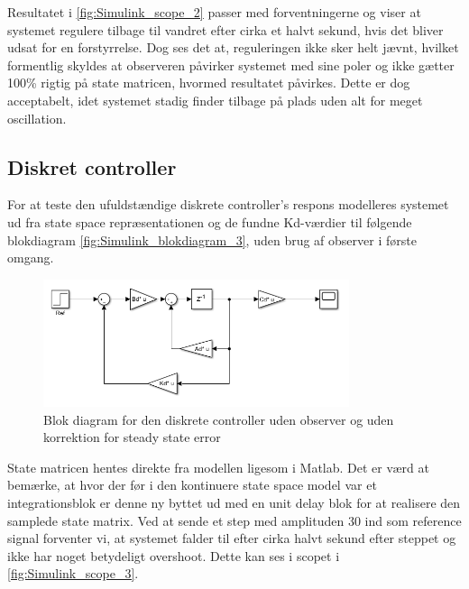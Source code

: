 Resultatet i \autoref{fig:Simulink_scope_2} passer med forventningerne og viser at systemet regulere tilbage til vandret efter cirka et halvt sekund, hvis det bliver udsat for en forstyrrelse. Dog ses det at, reguleringen ikke sker helt jævnt, hvilket formentlig skyldes at observeren påvirker systemet med sine poler og ikke gætter 100\% rigtig på state matricen, hvormed resultatet påvirkes. Dette er dog acceptabelt, idet systemet stadig finder tilbage på plads uden alt for meget oscillation. 

\subsection{Diskret controller}
For at teste den ufuldstændige diskrete controller's respons modelleres systemet ud fra state space repræsentationen og de fundne Kd-værdier til følgende blokdiagram \autoref{fig:Simulink_blokdiagram_3}, uden brug af observer i første omgang. 

\begin{figure}[H]
	\centering
	\includegraphics[width = 0.80\textwidth]{figur/Simulink_blokdiagram_3}
	\caption{Blok diagram for den diskrete controller uden observer og uden korrektion for steady state error}
	\label{fig:Simulink_blokdiagram_3}
\end{figure}

State matricen hentes direkte fra modellen ligesom i Matlab. Det er værd at bemærke, at hvor der før i den kontinuere state space model var et integrationsblok er denne ny byttet ud med en unit delay blok for at realisere den samplede state matrix. Ved at sende et step med amplituden 30 ind som reference signal forventer vi, at systemet falder til efter cirka halvt sekund efter steppet og ikke har noget betydeligt overshoot. Dette kan ses i scopet i \autoref{fig:Simulink_scope_3}.

